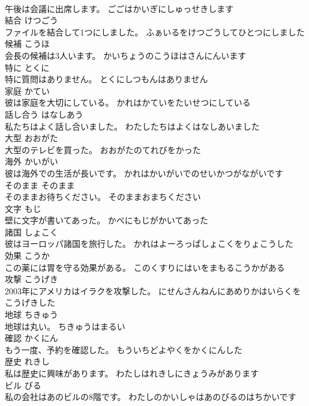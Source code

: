 \documentclass[8pt]{extreport}
\begin{document}
\begin{CJK}{UTF8}{min}
\\	午後は会議に出席します。	ごごはかいぎにしゅっせきします	
\\	結合	けつごう	
\\	ファイルを結合して1つにしました。	ふぁいるをけつごうしてひとつにしました	
\\	候補	こうほ	
\\	会長の候補は3人います。	かいちょうのこうほはさんにんいます	
\\	特に	とくに	
\\	特に質問はありません。	とくにしつもんはありません	
\\	家庭	かてい	
\\	彼は家庭を大切にしている。	かれはかていをたいせつにしている	
\\	話し合う	はなしあう	
\\	私たちはよく話し合いました。	わたしたちはよくはなしあいました	
\\	大型	おおがた	
\\	大型のテレビを買った。	おおがたのてれびをかった	
\\	海外	かいがい	
\\	彼は海外での生活が長いです。	かれはかいがいでのせいかつがながいです	
\\	そのまま	そのまま	
\\	そのままお待ちください。	そのままおまちください	
\\	文字	もじ	
\\	壁に文字が書いてあった。	かべにもじがかいてあった	
\\	諸国	しょこく	
\\	彼はヨーロッパ諸国を旅行した。	かれはよーろっぱしょこくをりょこうした	
\\	効果	こうか	
\\	この薬には胃を守る効果がある。	このくすりにはいをまもるこうかがある	
\\	攻撃	こうげき	
\\	2003年にアメリカはイラクを攻撃した。	にせんさんねんにあめりかはいらくをこうげきした	
\\	地球	ちきゅう	
\\	地球は丸い。	ちきゅうはまるい	
\\	確認	かくにん	
\\	もう一度、予約を確認した。	もういちどよやくをかくにんした	
\\	歴史	れきし	
\\	私は歴史に興味があります。	わたしはれきしにきょうみがあります	
\\	ビル	びる	
\\	私の会社はあのビルの8階です。	わたしのかいしゃはあのびるのはちかいです	

\end{CJK}
\end{document}
